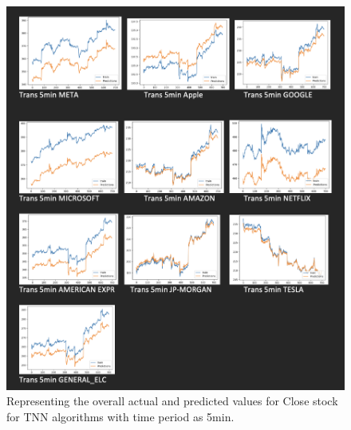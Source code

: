\begin{figure}[ht]
    \centering
    \includegraphics[scale=0.2]{figures/Trans 5min.png}
    \caption{Representing the overall actual and predicted values for Close stock for TNN algorithms with time period as 5min.}
    \label{fig:chart_c}
\end{figure}


